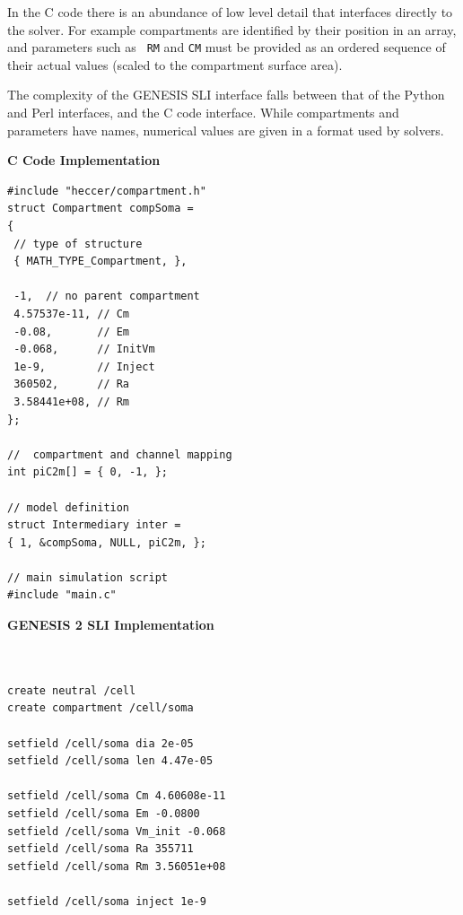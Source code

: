 \documentclass[12pt]{article}
\begin{document}
In the C code there is an abundance of low level detail that
interfaces directly to the solver.  For example compartments are
identified by their position in an array, and parameters such as {\tt
  RM} and {\tt CM} must be provided as an ordered sequence of their
actual values (scaled to the compartment surface area).

The complexity of the GENESIS SLI interface falls between that of the
Python and Perl interfaces, and the C code interface.  While
compartments and parameters have names, numerical values are given in
a format used by solvers.

{\vspace*{3mm} \footnotesize
  \begin{minipage}{1\linewidth}
    
    \begin{minipage}[t]{.50\linewidth}
{\bf C Code Implementation}
\resetlinenumber
\begin{verbatim}
#include "heccer/compartment.h"
struct Compartment compSoma =
{
 // type of structure
 { MATH_TYPE_Compartment, },

 -1,  // no parent compartment
 4.57537e-11, // Cm
 -0.08,       // Em
 -0.068,      // InitVm
 1e-9,        // Inject
 360502,      // Ra
 3.58441e+08, // Rm
};

//  compartment and channel mapping
int piC2m[] = { 0, -1, };

// model definition
struct Intermediary inter =
{ 1, &compSoma, NULL, piC2m, };

// main simulation script
#include "main.c"

\end{verbatim}
    \end{minipage}
    \begin{minipage}[t]{.50\linewidth}
{\bf GENESIS 2 SLI Implementation}
\resetlinenumber
\begin{verbatim}


create neutral /cell
create compartment /cell/soma

setfield /cell/soma dia 2e-05
setfield /cell/soma len 4.47e-05

setfield /cell/soma Cm 4.60608e-11
setfield /cell/soma Em -0.0800
setfield /cell/soma Vm_init -0.068
setfield /cell/soma Ra 355711
setfield /cell/soma Rm 3.56051e+08

setfield /cell/soma inject 1e-9








\end{verbatim}
\end{minipage}
\end{minipage}}
\end{document}
